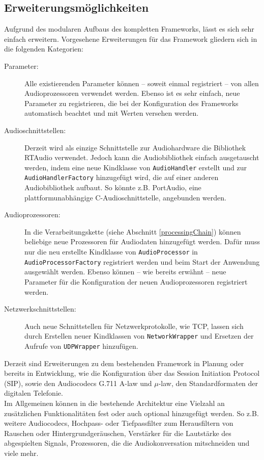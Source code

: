 \subsection{Erweiterungsmöglichkeiten}
Aufgrund des modularen Aufbaus des kompletten Frameworks, lässt es sich sehr einfach erweitern. Vorgesehene Erweiterungen für das Framework gliedern sich in die folgenden Kategorien:
\begin{description}
\item[Parameter:] Alle existierenden Parameter können -- soweit einmal registriert -- von allen Audioprozessoren verwendet werden. Ebenso ist es sehr einfach, neue Parameter zu registrieren, die bei der Konfiguration des Frameworks automatisch beachtet und mit Werten versehen werden.
\item[Audioschnittstellen:] Derzeit wird als einzige Schnittstelle zur Audiohardware die Bibliothek RTAudio verwendet. Jedoch kann die Audiobibliothek einfach ausgetauscht werden, indem eine neue Kindklasse von \texttt{AudioHandler} erstellt und zur \texttt{AudioHandlerFactory} hinzugefügt wird, die auf einer anderen Audiobibliothek aufbaut. So könnte z.B. PortAudio, eine plattformunabhängige C-Audioschnittstelle, angebunden werden.
\item[Audioprozessoren:] In die Verarbeitungskette (siehe Abschnitt \ref{processingChain}) können beliebige neue Prozessoren für Audiodaten hinzugefügt werden. Dafür muss nur die neu erstellte Kindklasse von \texttt{AudioProcessor} in \texttt{AudioProcessorFactory} registriert werden und beim Start der Anwendung ausgewählt werden. Ebenso können -- wie bereits erwähnt -- neue Parameter für die Konfiguration der neuen Audioprozessoren registriert werden.
\item[Netzwerkschnittstellen:] Auch neue Schnittstellen für Netzwerkprotokolle, wie TCP, lassen sich durch Erstellen neuer Kindklassen von \texttt{NetworkWrapper} und Ersetzen der Aufrufe von \texttt{UDPWrapper} hinzufügen.
\end{description}
Derzeit sind Erweiterungen zu dem bestehenden Framework in Planung oder bereits in Entwicklung, wie die Konfiguration über das Session Initiation Protocol (SIP), sowie den Audiocodecs G.711 A-law und $\mu$-law, den Standardformaten der digitalen Telefonie.
\\
Im Allgemeinen können in die bestehende Architektur eine Vielzahl an zusätzlichen Funktionalitäten fest oder auch optional hinzugefügt werden. So z.B. weitere Audiocodecs, Hochpass- oder Tiefpassfilter zum Herausfiltern von Rauschen oder Hintergrundgeräuschen, Verstärker für die Lautstärke des abgespielten Signals, Prozessoren, die die Audiokonversation mitschneiden und viele mehr.

